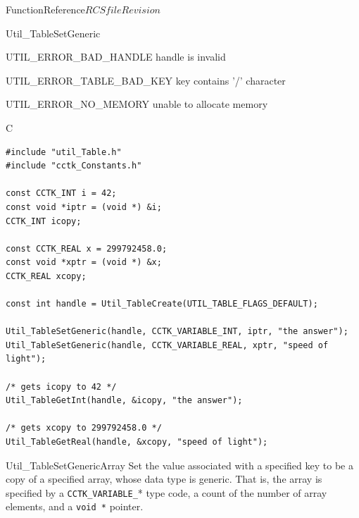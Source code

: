 \begin{cactuspart}{FunctionReference}{$RCSfile$}{$Revision$}
\begin{FunctionDescription}{Util\_TableSetGeneric}
\begin{ErrorSection}
\begin{Error}{UTIL\_ERROR\_BAD\_HANDLE}
handle is invalid
\end{Error}
\begin{Error}{UTIL\_ERROR\_TABLE\_BAD\_KEY}
key contains '/' character
\end{Error}
\begin{Error}{UTIL\_ERROR\_NO\_MEMORY}
unable to allocate memory
\end{Error}
\end{ErrorSection}

\begin{ExampleSection}
\begin{Example}{C}
\begin{verbatim}
#include "util_Table.h"
#include "cctk_Constants.h"

const CCTK_INT i = 42;
const void *iptr = (void *) &i;
CCTK_INT icopy;

const CCTK_REAL x = 299792458.0;
const void *xptr = (void *) &x;
CCTK_REAL xcopy;

const int handle = Util_TableCreate(UTIL_TABLE_FLAGS_DEFAULT);

Util_TableSetGeneric(handle, CCTK_VARIABLE_INT, iptr, "the answer");
Util_TableSetGeneric(handle, CCTK_VARIABLE_REAL, xptr, "speed of light");

/* gets icopy to 42 */
Util_TableGetInt(handle, &icopy, "the answer");

/* gets xcopy to 299792458.0 */
Util_TableGetReal(handle, &xcopy, "speed of light");
\end{verbatim}
\end{Example}
\end{ExampleSection}
\end{FunctionDescription}


\begin{FunctionDescription}{Util\_TableSetGenericArray}
\label{Util-TableSetGenericArray}
Set the value associated with a specified key to be a copy of a
specified array, whose data type is generic.  That is, the array
is specified by a \verb|CCTK_VARIABLE_|* type code, a count of
the number of array elements, and a \verb|void *| pointer.


\end{FunctionDescription}
\end{cactuspart}
